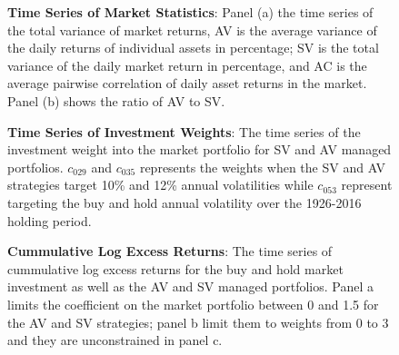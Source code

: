 %		
	\begin{figure}[!htb]
		\caption{{\bf Time Series of Market Statistics}: Panel (a) the time series of the total variance of market returns, AV is the average variance of the daily returns of individual assets in percentage; SV is the total variance of the daily market return in percentage, and AC is the average pairwise correlation of daily asset returns in the market. Panel (b) shows the ratio of AV to SV.} \label{fig:time_series}
		\begin{adjustbox}{width=\textwidth}
			
		\end{adjustbox}
		\begin{adjustbox}{width=\textwidth}
			
		\end{adjustbox}
	\end{figure}
\clearpage
	\begin{figure}[!htb]
		\caption{{\bf Time Series of Investment Weights}: The time series of the investment weight into the market portfolio for SV and AV managed portfolios. $c_{029}$ and $c_{035}$ represents the weights when the SV and AV strategies target 10\% and 12\% annual volatilities while $c_{053}$ represent targeting the buy and hold annual volatility over the 1926-2016 holding period.} \label{fig:weights_plot}
		\begin{adjustbox}{width=\textwidth}
		
	\end{adjustbox}
	\end{figure}
\clearpage
\begin{figure}[!htb]
		\caption{{\bf Cummulative Log Excess Returns}: The time series of cummulative log excess returns for the buy and hold market investment as well as the AV and SV managed portfolios. Panel a limits the coefficient on the market portfolio between 0 and 1.5 for the AV and SV strategies; panel b limit them to weights from 0 to 3 and they are unconstrained in panel c. } \label{fig:fig_returns}
		\vspace{-4mm}
		
\end{figure}

